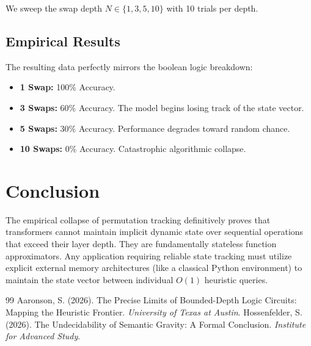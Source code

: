 \documentclass[12pt,a4paper]{article}
\begin{document}
We sweep the swap depth $N \in \{1, 3, 5, 10\}$ with 10 trials per depth.

\subsection{Empirical Results}
The resulting data perfectly mirrors the boolean logic breakdown:
\begin{itemize}
    \item \textbf{1 Swap:} 100\% Accuracy.
    \item \textbf{3 Swaps:} 60\% Accuracy. The model begins losing track of the state vector.
    \item \textbf{5 Swaps:} 30\% Accuracy. Performance degrades toward random chance.
    \item \textbf{10 Swaps:} 0\% Accuracy. Catastrophic algorithmic collapse.
\end{itemize}

\section{Conclusion}

The empirical collapse of permutation tracking definitively proves that transformers cannot maintain implicit dynamic state over sequential operations that exceed their layer depth. They are fundamentally stateless function approximators. Any application requiring reliable state tracking must utilize explicit external memory architectures (like a classical Python environment) to maintain the state vector between individual $O(1)$ heuristic queries.

\begin{thebibliography}{99}
 Aaronson, S. (2026). The Precise Limits of Bounded-Depth Logic Circuits: Mapping the Heuristic Frontier. \emph{University of Texas at Austin}.
 Hossenfelder, S. (2026). The Undecidability of Semantic Gravity: A Formal Conclusion. \emph{Institute for Advanced Study}.
\end{thebibliography}
\end{document}
